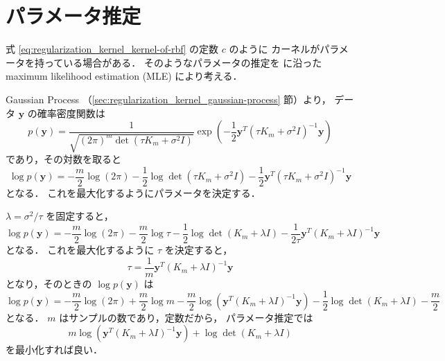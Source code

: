 \section{パラメータ推定}\label{sec:regularization_kernel_param-est}

式 \eqref{eq:regularization_kernel_kernel-of-rbf} の定数 $c$ のように
カーネルがパラメータを持っている場合がある．
そのようなパラメータの推定を
\cite[Remark 3 (Connection to spatial statistics)]{Scheuerer2011}
に沿った
maximum likelihood estimation (MLE)
により考える．

Gaussian Process （\ref{sec:regularization_kernel_gaussian-process} 節）より，
データ $\bm{y}$ の確率密度関数は
\begin{equation}
    p(\bm{y}) = \frac{1}{\sqrt{(2\pi)^{m} \det(\tau K_m + \sigma^2 I)}}
    \exp\left(-\frac{1}{2} \bm{y}^T (\tau K_m + \sigma^2 I)^{-1} \bm{y} \right)
\end{equation}
であり，その対数を取ると
\begin{equation}
    \log{p(\bm{y})}
    = -\frac{m}{2}\log(2\pi)
    - \frac{1}{2} \log{\det(\tau K_m + \sigma^2 I)}
    - \frac{1}{2} \bm{y}^T (\tau K_m + \sigma^2 I)^{-1} \bm{y}
\end{equation}
となる．
これを最大化するようにパラメータを決定する．

$\lambda = \sigma^2 / \tau$ を固定すると，
\begin{equation}
    \log{p(\bm{y})}
    = -\frac{m}{2}\log(2\pi)
    - \frac{m}{2} \log{\tau}
    - \frac{1}{2} \log{\det(K_m + \lambda I)}
    - \frac{1}{2\tau} \bm{y}^T (K_m + \lambda I)^{-1} \bm{y}
\end{equation}
となる．
これを最大化するように $\tau$ を決定すると，
\begin{equation}
    \tau = \frac{1}{m} \bm{y}^T (K_m + \lambda I)^{-1} \bm{y}
    \label{eq:interp_kernel_param_coeff_tau}
\end{equation}
となり，そのときの $\log{p(\bm{y})}$ は
\begin{equation}
    \log{p(\bm{y})}
    = -\frac{m}{2}\log(2\pi)
    + \frac{m}{2} \log{m}
    - \frac{m}{2} \log(\bm{y}^T (K_m + \lambda I)^{-1} \bm{y})
    - \frac{1}{2} \log{\det(K_m + \lambda I)}
    - \frac{m}{2}
\end{equation}
となる．
$m$ はサンプルの数であり，定数だから，
パラメータ推定では
\begin{equation}
    m \log(\bm{y}^T (K_m + \lambda I)^{-1} \bm{y})
    + \log{\det(K_m + \lambda I)}
\end{equation}
を最小化すれば良い．

